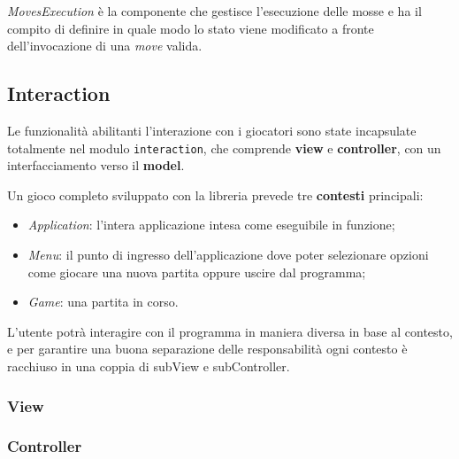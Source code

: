 \textit{MovesExecution} è la componente che gestisce l'esecuzione delle mosse e ha il compito di definire in quale modo lo stato viene modificato a fronte dell'invocazione di una \textit{move} valida.

\subsection{Interaction}

Le funzionalità abilitanti l'interazione con i giocatori sono state incapsulate totalmente nel modulo \texttt{interaction}, che comprende \textbf{view} e \textbf{controller}, con un interfacciamento verso il \textbf{model}.

Un gioco completo sviluppato con la libreria prevede tre \textbf{contesti} principali:
\begin{itemize}
    \item \textit{Application}: l'intera applicazione intesa come eseguibile in funzione; %
    \item \textit{Menu}: il punto di ingresso dell'applicazione dove poter selezionare opzioni come giocare una nuova partita oppure uscire dal programma;
    \item \textit{Game}: una partita in corso.
\end{itemize}

L'utente potrà interagire con il programma in maniera diversa in base al contesto, e per garantire una buona separazione delle responsabilità ogni contesto è racchiuso in una coppia di subView e subController.

\subsubsection{View}
\subsubsection{Controller}
